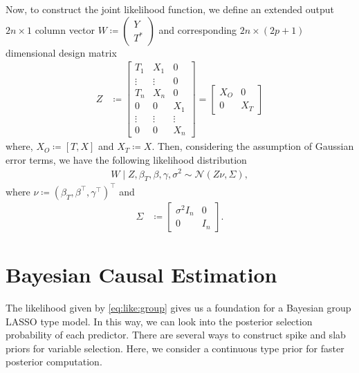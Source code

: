 \documentclass[preprint,12pt]{elsarticle}
\newcommand{\normal}{\mathcal{N}}
\begin{document}
Now, to construct the joint likelihood function, we define an extended
output $2n\times 1$ column vector
$W\coloneqq\left(\begin{smallmatrix}Y \\ T^*\end{smallmatrix}\right)$
and corresponding $2n\times(2p+1)$ dimensional design matrix
\begin{align}
	Z &\coloneqq
        \begin{bmatrix}
           T_1 & X_1 & 0 \\
           \vdots & \vdots & 0 \\
           T_n & X_n & 0 \\
           0 & 0 & X_1 \\
           \vdots & \vdots & \vdots \\
           0 & 0 & X_n
        \end{bmatrix}
        =
	\begin{bmatrix}
		X_O & 0 \\
		0 & X_T
	\end{bmatrix}
\end{align}
where, $X_O \coloneqq [T, X]$ and $X_T \coloneqq X$. Then, considering the assumption of
Gaussian error terms, we have the following likelihood distribution
\begin{align}
	W\mid Z, \beta_T, \beta, \gamma, \sigma^2 \sim\normal\left(Z\nu, \Sigma\right)\label{eq:like:group},
\end{align}
where $\nu \coloneqq (\beta_T, \beta^{\top}, \gamma^{\top})^{\top}$ and
\begin{align}
	\Sigma &\coloneqq
	\begin{bmatrix}
		\sigma^2{I}_n & 0 \\
		0 & {I}_n
	\end{bmatrix}.
\end{align}


\section{Bayesian Causal Estimation}\label{sec:bayes}

The likelihood given by \cref{eq:like:group} gives us
a foundation for a Bayesian group LASSO 
\citep{xu2015} type model. In this way, we can look into the posterior selection
probability of each predictor. There are several
ways to construct spike and slab priors for
variable selection. Here, we consider a continuous type
prior \citep{ishwaran2005} for faster posterior
computation.
\end{document}
